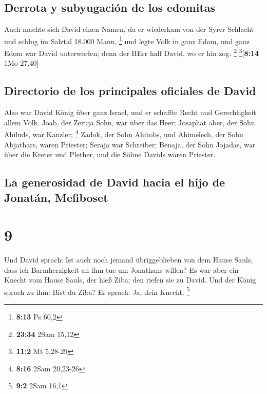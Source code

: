 \hypertarget{derrota-y-subyugaciuxf3n-de-los-edomitas}{%
\subsection{Derrota y subyugación de los
edomitas}\label{derrota-y-subyugaciuxf3n-de-los-edomitas}}

 Auch machte sich David einen Namen, da er wiederkam von
der Syrer Schlacht und schlug im Salztal 18.000 Mann, \footnote{\textbf{8:13}
  Ps 60,2}  und legte Volk in ganz Edom, und ganz Edom
war David unterworfen; denn der HErr half David, wo er hin zog.
\footnote{\textbf{23:34} 2Sam 15,12} \footnote{\textbf{11:2} Mt 5,28-29}{[}\textbf{8:14}
1Mo 27,40{]}

\hypertarget{directorio-de-los-principales-oficiales-de-david}{%
\subsection{Directorio de los principales oficiales de
David}\label{directorio-de-los-principales-oficiales-de-david}}

 Also war David König über ganz Israel, und er schaffte
Recht und Gerechtigkeit allem Volk.  Joab, der Zeruja
Sohn, war über das Heer; Josaphat aber, der Sohn Ahiluds, war Kanzler;
\footnote{\textbf{8:16} 2Sam 20,23-26}  Zadok, der Sohn
Ahitobs, und Ahimelech, der Sohn Abjathars, waren Priester; Seraja war
Schreiber;  Benaja, der Sohn Jojadas, war über die Kreter
und Plether, und die Söhne Davids waren Priester.

\hypertarget{la-generosidad-de-david-hacia-el-hijo-de-jonatuxe1n-mefiboset}{%
\subsection{La generosidad de David hacia el hijo de Jonatán,
Mefiboset}\label{la-generosidad-de-david-hacia-el-hijo-de-jonatuxe1n-mefiboset}}

\hypertarget{section-8}{%
\section{9}\label{section-8}}

 Und David sprach: Ist auch noch jemand übriggeblieben von
dem Hause Sauls, dass ich Barmherzigkeit an ihm tue um Jonathans willen?
 Es war aber ein Knecht vom Hause Sauls, der hieß Ziba;
den riefen sie zu David. Und der König sprach zu ihm: Bist du Ziba? Er
sprach: Ja, dein Knecht. \footnote{\textbf{9:2} 2Sam 16,1}

